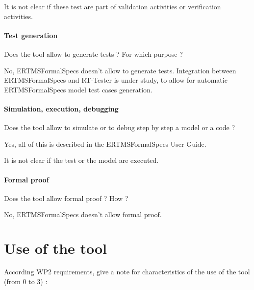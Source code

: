 \begin{assessor2}
It is not clear if these test are part of validation activities or verification activities.
\end{assessor2}


\paragraph{Test generation}
Does the tool allow to generate tests ? For  which purpose ?

\begin{author_comment}
No, ERTMSFormalSpecs doesn't allow to generate tests. Integration between ERTMSFormalSpecs and RT-Tester is under study, to allow for automatic ERTMSFormalSpecs model test cases generation.
\end{author_comment}

\paragraph{Simulation, execution, debugging}
Does the tool allow to simulate or to debug step by step a model or a code ?

\begin{author_comment}
Yes, all of this is described in the ERTMSFormalSpecs User Guide.
\end{author_comment}


\begin{assessor2}
It is not clear if the test or the model are executed.
\end{assessor2}



\paragraph{Formal proof}
Does the tool allow formal proof ?  How ?

\begin{author_comment}
No, ERTMSFormalSpecs doesn't allow formal proof. 
\end{author_comment}

\section{Use of the tool}

According WP2 requirements, give a note for characteristics of the use of the tool (from 0 to 3) :

